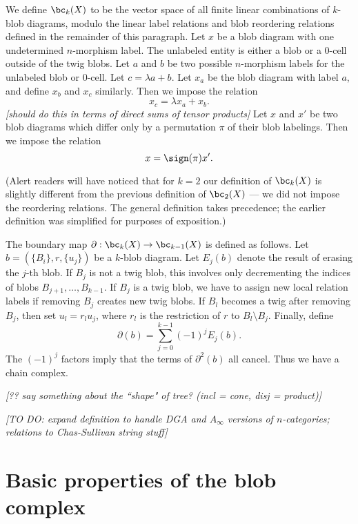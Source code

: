 \documentclass[11pt,leqno]{amsart}
\def\bd{\partial}
\def\setmin{\setminus}
\def\nn#1{{{\it \small [#1]}}}
\newcommand{\eq}[1]{\begin{displaymath}#1\end{displaymath}}
\begin{document}
We define $\bc_k(X)$ to be the vector space of all finite linear combinations
of $k$-blob diagrams, modulo the linear label relations and
blob reordering relations defined in the remainder of this paragraph.
Let $x$ be a blob diagram with one undetermined $n$-morphism label.
The unlabeled entity is either a blob or a 0-cell outside of the twig blobs.
Let $a$ and $b$ be two possible $n$-morphism labels for
the unlabeled blob or 0-cell.
Let $c = \lambda a + b$.
Let $x_a$ be the blob diagram with label $a$, and define $x_b$ and $x_c$ similarly.
Then we impose the relation
\eq{
    x_c = \lambda x_a + x_b .
}
\nn{should do this in terms of direct sums of tensor products}
Let $x$ and $x'$ be two blob diagrams which differ only by a permutation $\pi$
of their blob labelings.
Then we impose the relation
\eq{
    x = \sign(\pi) x' .
}

(Alert readers will have noticed that for $k=2$ our definition
of $\bc_k(X)$ is slightly different from the previous definition
of $\bc_2(X)$ --- we did not impose the reordering relations.
The general definition takes precedence;
the earlier definition was simplified for purposes of exposition.)

The boundary map $\bd : \bc_k(X) \to \bc_{k-1}(X)$ is defined as follows.
Let $b = (\{B_i\}, r, \{u_j\})$ be a $k$-blob diagram.
Let $E_j(b)$ denote the result of erasing the $j$-th blob.
If $B_j$ is not a twig blob, this involves only decrementing
the indices of blobs $B_{j+1},\ldots,B_{k-1}$.
If $B_j$ is a twig blob, we have to assign new local relation labels
if removing $B_j$ creates new twig blobs.
If $B_l$ becomes a twig after removing $B_j$, then set $u_l = r_lu_j$,
where $r_l$ is the restriction of $r$ to $B_l \setmin B_j$.
Finally, define
\eq{
    \bd(b) = \sum_{j=0}^{k-1} (-1)^j E_j(b).
}
The $(-1)^j$ factors imply that the terms of $\bd^2(b)$ all cancel.
Thus we have a chain complex.

\nn{?? say something about the ``shape" of tree? (incl = cone, disj = product)}


\nn{TO DO:
expand definition to handle DGA and $A_\infty$ versions of $n$-categories;
relations to Chas-Sullivan string stuff}



\section{Basic properties of the blob complex}
\label{sec:basic-properties}
\end{document}
